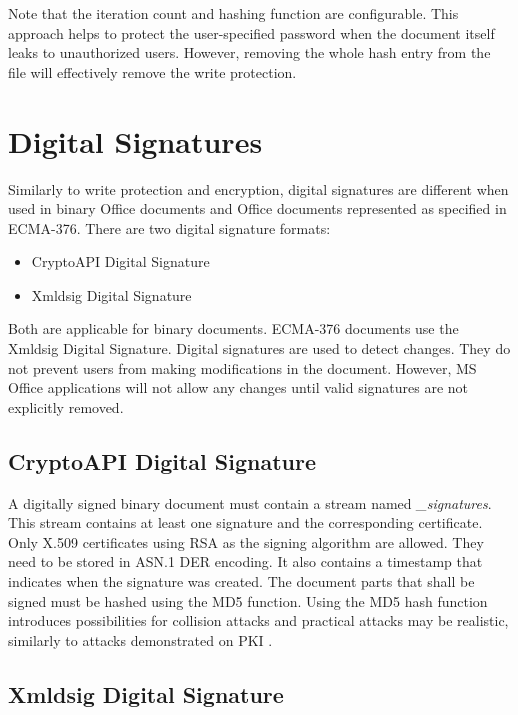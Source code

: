 \documentclass[11pt,oneside]{fithesis2}
\begin{document}
Note that the iteration count and hashing function are configurable. This approach helps to protect the user-specified password when the document itself leaks to unauthorized users. However, removing the whole hash entry from the file will effectively remove the write protection.

\section{Digital Signatures}\label{data_integrity}

Similarly to write protection and encryption, digital signatures are different when used in binary Office documents and Office documents represented as specified in ECMA-376. There are two digital signature formats:

\begin{itemize}
\setlength\itemsep{0.1em}
	\item{CryptoAPI Digital Signature}
	\item{Xmldsig Digital Signature}
\end{itemize}

Both are applicable for binary documents. ECMA-376 documents use the Xmldsig Digital Signature. Digital signatures are used to detect changes. They do not prevent users from making modifications in the document. However, MS Office applications will not allow any changes until valid signatures are not explicitly removed.

\subsection{CryptoAPI Digital Signature} 

A digitally signed binary document must contain a stream named \textit{\_signatures}. This stream contains at least one signature and the corresponding certificate. Only X.509 certificates using RSA as the signing algorithm are allowed. They need to be stored in ASN.1 DER encoding. It also contains a timestamp that indicates when the signature was created. The document parts that shall be signed must be hashed using the MD5 function. Using the MD5 hash function introduces possibilities for collision attacks and practical attacks may be realistic, similarly to attacks demonstrated on PKI \cite{md5_vulnerable}. 


\subsection{Xmldsig Digital Signature}
\end{document}
